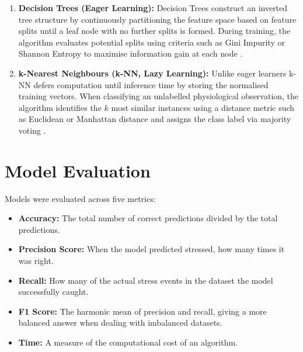 \documentclass[10pt, a4paper]{article}
\begin{document}
\begin{enumerate}
    \item \textbf{Decision Trees (Eager Learning):} Decision Trees construct an inverted tree structure by continuously partitioning the feature space based on feature splits until a leaf node with no further splits is formed. During training, the algorithm evaluates potential splits using criteria such as Gini Impurity or Shannon Entropy to maximise information gain at each node \parencite{ullah2025topic2}. %
    \item \textbf{k-Nearest Neighbours (k-NN, Lazy Learning):} Unlike eager learners k-NN defers computation until inference time by storing the normalised training vectors. When classifying an unlabelled physiological observation, the algorithm identifies the $k$ most similar instances using a distance metric such as Euclidean or Manhattan distance and assigns the class label via majority voting \parencite{ullah2025topic3}. %
\end{enumerate}

\section{Model Evaluation}
Models were evaluated across five metrics:
\begin{itemize}
    \item \textbf{Accuracy:} The total number of correct predictions divided by the total predictions.
    \item \textbf{Precision Score:} When the model predicted stressed, how many times it was right.
    \item \textbf{Recall:} How many of the actual stress events in the dataset the model successfully caught.
    \item \textbf{F1 Score:} The harmonic mean of precision and recall, giving a more balanced answer when dealing with imbalanced datasets.
    \item \textbf{Time:} A measure of the computational cost of an algorithm.
\end{itemize}
\end{document}
